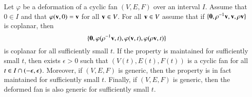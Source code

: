 \begin{lemma}\label{lemma:fan-open}
Let $\varphi$ be a deformation of a  cyclic fan $(V,E,F)$ over an interval $I$.
Assume that $0\in I$ and that $\varphi({\mathbf v},0)={\mathbf v}$ for all ${\mathbf v}\in V$.
For all ${\mathbf v}\in V$ assume that if $\{{\mathbf 0},\rho^{-1}{\mathbf v},{\mathbf v},\rho{\mathbf v}\}$ is coplanar, then 
$$\{{\mathbf 0},\varphi(\rho^{-1}{\mathbf v},t),\varphi({\mathbf v},t),\varphi(\rho {\mathbf v},t)\}$$
is coplanar for all sufficiently small $t$. 
If the property  is maintained for sufficiently small $t$, then
 exists $\epsilon>0$ such that $(V(t),E(t),F(t))$
is a  cyclic fan for all $t\in I\cap (-\epsilon,\epsilon)$.
Moreover, if $(V,E,F)$ is generic, then the property  is in fact maintained for sufficiently small $t$.  Finally, if $(V,E,F)$ is generic, then the deformed fan is also generic for sufficiently small $t$.
\end{lemma}

